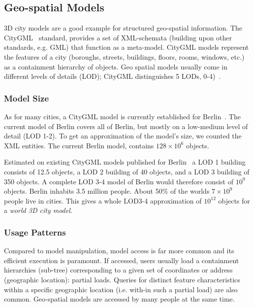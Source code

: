 \subsection{Geo-spatial Models}

3D city models are a good example for structured geo-spatial information. The CityGML~\cite{cityGML} standard, provides a set of XML-schemata (building upon other standards, e.g. GML) that function as a meta-model. CityGML models represent the features of a city (boroughs, streets, buildings, floors, rooms, windows, etc.) as a containment hierarchy of objects. 
Geo spatial models usually come in different levels of details (LOD); CityGML distinguishes 5 LODs, 0-4)~\cite{cityGML}. 

\subsubsection{Model Size}
As for many cities, a CityGML model is currently established for Berlin~\cite{berlinGML}. The current model of Berlin covers all of Berlin, but mostly on a low-medium level of detail (LOD 1-2). To get an approximation of the model's size, we counted the XML entities. The current Berlin model, contains $128\times 10^6$ objects. 

Estimated on existing CityGML models published for Berlin~\cite{berlinGML} a LOD 1 building consists of 12.5 objects, a LOD 2 building of 40 objects, and a LOD 3 building of 350 objects. A complete LOD 3-4 model of Berlin would therefore consist of $10^9$ objects. Berlin inhabits 3.5 million people. About 50\% of the worlds $7\times 10^9$ people live in cities. This gives a whole LOD3-4 approximation of $10^{12}$ objects for a \emph{world 3D city model}.

\subsubsection{Usage Patterns}
Compared to model manipulation, model access is far more common and its efficient execution is paramount. If accessed, users usually load a containment hierarchies (sub-tree) corresponding to a given set of coordinates or address (geographic location): partial loads. Queries for distinct feature characteristics within a specific geographic location (i.e. with-in such a partial load) are also common. Geo-spatial models are accessed by many people at the same time. 


